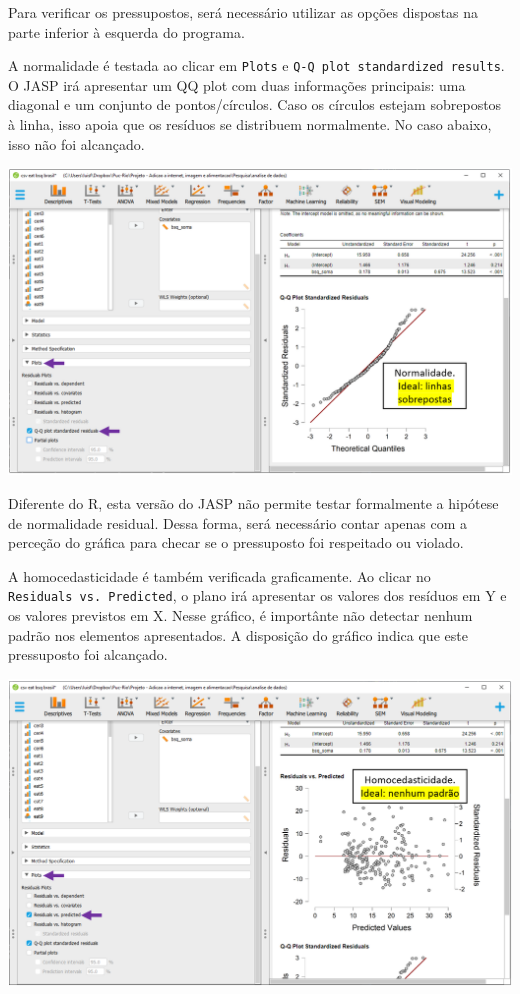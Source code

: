 \documentclass[
]{book}
\begin{document}
Para verificar os pressupostos, será necessário utilizar as opções dispostas na parte inferior à esquerda do programa.

A normalidade é testada ao clicar em \texttt{Plots} e \texttt{Q-Q\ plot\ standardized\ results}. O JASP irá apresentar um QQ plot com duas informações principais: uma diagonal e um conjunto de pontos/círculos. Caso os círculos estejam sobrepostos à linha, isso apoia que os resíduos se distribuem normalmente. No caso abaixo, isso não foi alcançado.

\includegraphics{./img/cap_reg_normalidade.png}

Diferente do R, esta versão do JASP não permite testar formalmente a hipótese de normalidade residual. Dessa forma, será necessário contar apenas com a perceção do gráfica para checar se o pressuposto foi respeitado ou violado.

A homocedasticidade é também verificada graficamente. Ao clicar no \texttt{Residuals\ vs.\ Predicted}, o plano irá apresentar os valores dos resíduos em Y e os valores previstos em X. Nesse gráfico, é importânte não detectar nenhum padrão nos elementos apresentados. A disposição do gráfico indica que este pressuposto foi alcançado.

\includegraphics{./img/cap_reg_homocedasticidade_jasp.png}
\end{document}
